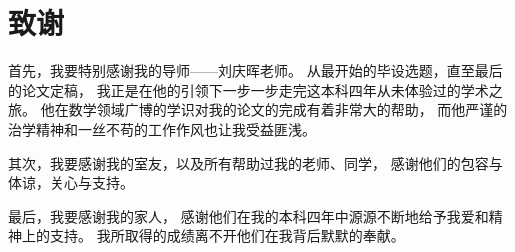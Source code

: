 
\chapter*{致谢}

首先，我要特别感谢我的导师——刘庆晖老师。
从最开始的毕设选题，直至最后的论文定稿，
我正是在他的引领下一步一步走完这本科四年从未体验过的学术之旅。
他在数学领域广博的学识对我的论文的完成有着非常大的帮助，
而他严谨的治学精神和一丝不苟的工作作风也让我受益匪浅。

其次，我要感谢我的室友，以及所有帮助过我的老师、同学，
感谢他们的包容与体谅，关心与支持。

最后，我要感谢我的家人，
感谢他们在我的本科四年中源源不断地给予我爱和精神上的支持。
我所取得的成绩离不开他们在我背后默默的奉献。
